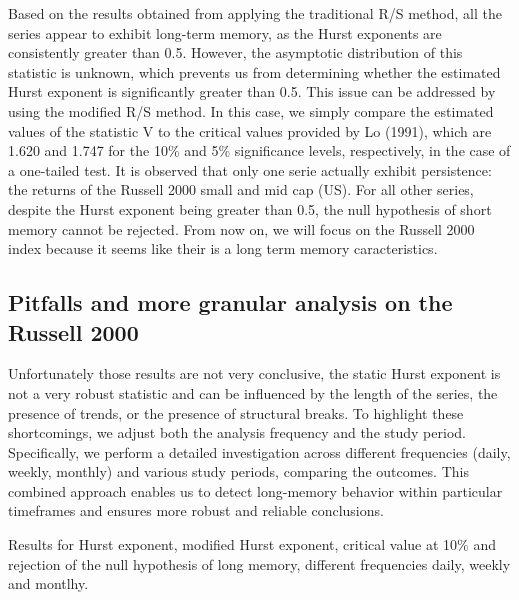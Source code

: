 \documentclass[11pt]{extarticle}
\begin{document}
\FloatBarrier


Based on the results obtained from applying the traditional R/S method, all the series appear to exhibit long-term memory,
as the Hurst exponents are consistently greater than 0.5. However, the asymptotic distribution of this statistic is unknown,
which prevents us from determining whether the estimated Hurst exponent is significantly greater than 0.5. This issue can be
addressed by using the modified R/S method. In this case, we simply compare the estimated values of the statistic V to the
critical values provided by Lo (1991), which are 1.620 and 1.747 for the 10\% and 5\% significance levels, respectively,
in the case of a one-tailed test. It is observed that only one serie actually exhibit persistence: the returns of the
Russell 2000 small and mid cap (US).
For all other series, despite the Hurst exponent being greater than 0.5, the null hypothesis
of short memory cannot be rejected.
From now on, we will focus on the Russell 2000 index because it seems like their is a long term memory caracteristics.


\subsection{Pitfalls and more granular analysis on the Russell 2000}

Unfortunately those results are not very conclusive, the static Hurst exponent is not a very robust statistic and can be
influenced by the length of the series, the presence of trends, or the presence of structural breaks.
To highlight these shortcomings, we adjust both the analysis frequency and the study period. Specifically, we perform a
detailed investigation across different frequencies (daily, weekly, monthly) and various study periods, comparing the
outcomes. This combined approach enables us to detect long-memory behavior within particular timeframes and ensures
more robust and reliable conclusions.

\begin{table}[h!]
    \centering
    \caption{Results for Hurst exponent, modified Hurst exponent, critical value at 10\% and rejection of the null
    hypothesis of long memory, different frequencies daily, weekly and montlhy.}
    \label{tab:frequencies_results}
\end{table}
\end{document}
